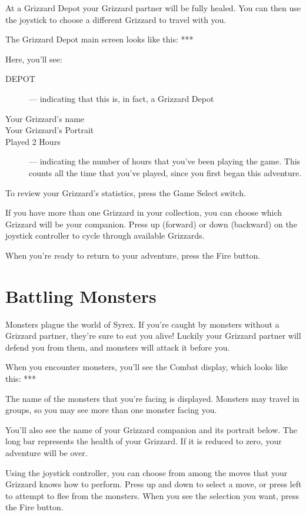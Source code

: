 \documentclass[12pt,twoside,openright,book]{memoir}
\begin{document}
At a Grizzard Depot your Grizzard partner will be fully healed. You can
then use the joystick to choose a different Grizzard to travel with you.

The Grizzard Depot main screen looks like this: ***

Here, you'll see:

\begin{description}
  
\item[DEPOT] --- indicating that this is, in fact, a Grizzard Depot
\item[Your Grizzard's name] 
\item[Your Grizzard's Portrait] 
\item[Played 2  Hours] ---  indicating the number  of hours  that you've
  been playing  the game. This counts  all the time that  you've played,
  since you first began this adventure.

\end{description}

To review your Grizzard's statistics, press the Game Select switch.

If you  have more than one  Grizzard in your collection,  you can choose
which  Grizzard will  be  your  companion. Press  up  (forward) or  down
(backward)  on  the  joystick  controller  to  cycle  through  available
Grizzards.

When you're ready to return to your adventure, press the Fire button.


\section{Battling Monsters}

Monsters plague the world of Syrex. If you're caught by monsters without
a Grizzard partner, they're sure to eat you alive! Luckily your Grizzard
partner  will  defend  you  from  them,  and  monsters  will  attack  it
before you.

When you encounter monsters, you'll  see the Combat display, which looks
like this: ***

The name of  the monsters that you're facing is  displayed. Monsters may
travel in groups, so you may see more than one monster facing you.

You'll also  see the name  of your  Grizzard companion and  its portrait
below. The  long bar represents  the health of  your Grizzard. If  it is
reduced to zero, your adventure will be over.

Using the joystick controller, you can  choose from among the moves that
your Grizzard knows how to perform. Press  up and down to select a move,
or press  left to attempt  to flee from the  monsters. When you  see the
selection you want, press the Fire button.
\end{document}
